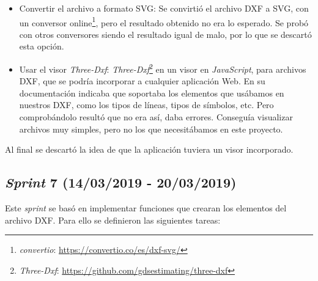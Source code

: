 \begin{itemize}
\item Convertir el archivo a formato SVG: Se convirtió el archivo DXF a SVG, con un conversor online\footnote{\textsl{convertio}: \url{https://convertio.co/es/dxf-svg/}}, pero el resultado obtenido no era lo esperado. Se probó con otros conversores siendo el resultado igual de malo, por lo que se descartó esta opción.
  
\item Usar el visor \emph{Three-Dxf}: \emph{Three-Dxf}\footnote{\textsl{Three-Dxf}: \url{https://github.com/gdsestimating/three-dxf}} en un visor en \emph{JavaScript}, para archivos DXF, que se podría incorporar a cualquier aplicación Web. En su documentación indicaba que soportaba los elementos que usábamos en nuestros DXF, como los tipos de líneas, tipos de símbolos, etc. Pero comprobándolo resultó que no era así, daba errores. Conseguía visualizar archivos muy simples, pero no los que necesitábamos en este proyecto.
\end{itemize}

Al final se descartó la idea de que la aplicación tuviera un visor incorporado.

\subsection{\emph{Sprint} 7 (14/03/2019 - 20/03/2019)}

Este \emph{sprint} se basó en implementar funciones que crearan los elementos del archivo DXF. Para ello se definieron las siguientes tareas:

